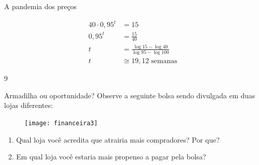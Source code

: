 \begin{answer}{A pandemia dos preços}
{\begin{enumerate}
\begin{align*}
40\cdot0{,}95^t&=15\\
0{,}95^t&=\frac{15}{40}\\
t&=\frac{\log15-\log40}{\log95-\log100}\\
t&\cong19{,}12\text{ semanas}
\end{align*}

\end{enumerate}
}{9}
\end{answer}


\begin{task}{Armadilha ou oportunidade?}
Observe a seguinte bolsa sendo divulgada em duas lojas diferentes:

\begin{figure}[H]
\centering

\texttt{[image: financeira3]}
\end{figure}

\begin{enumerate}
  \item Qual loja você acredita que atrairia mais compradores? Por que?
  \item Em qual loja você estaria mais propenso a pagar pela bolsa?
\end{enumerate}
\end{task}



